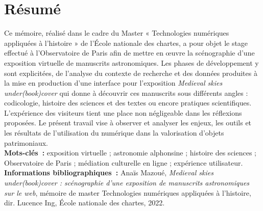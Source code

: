 \chapter{Résumé}
	\medskip
	Ce mémoire, réalisé dans le cadre du Master « Technologies numériques appliquées à l’histoire » de l’École nationale des chartes, a pour objet le stage effectué à l'Observatoire de Paris afin de mettre en œuvre la scénographie d'une exposition virtuelle de manuscrits astronomiques. Les phases de développement y sont explicitées, de l'analyse du contexte de recherche et des données produites à la mise en production d'une interface pour l'exposition \textit{Medieval skies under(book)cover} qui donne à découvrir ces manuscrits sous différents angles : codicologie, histoire des sciences et des textes ou encore pratiques scientifiques. L'expérience des visiteurs tient une place non négligeable dans les réflexions proposées. Le présent travail vise à observer et analyser les enjeux, les outils et les résultats de l'utilisation du numérique dans la valorisation d'objets patrimoniaux. \\
	
	\textbf{Mots-clés~:} exposition virtuelle ; astronomie alphonsine ; histoire des sciences ; Observatoire de Paris ; médiation culturelle en ligne ; expérience utilisateur. \\
	
	\textbf{Informations bibliographiques~:} Anaïs Mazoué, \textit{Medieval skies under(book)cover : scénographie d'une exposition de manuscrits astronomiques sur le web}, mémoire de master \og{}Technologies numériques appliquées à l'histoire\fg{}, dir. Lucence Ing, École nationale des chartes, 2022.
	